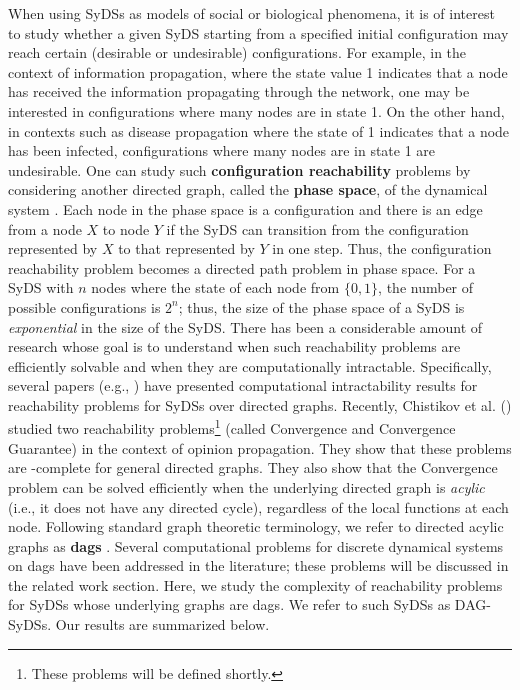 When using SyDSs as models of social or biological phenomena, it is of interest 
to study whether a given SyDS starting from a specified
initial configuration  may reach certain
(desirable or undesirable) configurations.
For example, in the context of information propagation, where the
state value 1 indicates that a node has received the information
propagating through the network,
one may be interested in configurations where many nodes are in state 1.
On the other hand, in contexts such as disease propagation where
the state of 1 indicates that a node has been infected,
configurations where many nodes are in state 1 are undesirable.
One can study such \textbf{configuration reachability} problems
by considering another directed graph,
called the \textbf{phase space}, of the dynamical system \cite{MR-2007}.
Each node in the phase space is a configuration and there is an
edge from a node $X$ to node $Y$ if the SyDS can transition from
the configuration represented by $X$ to that represented by
$Y$ in one step.
Thus, the configuration reachability problem becomes a directed
path problem in phase space.
For a SyDS with $n$ nodes where the state of each node from $\{0,1\}$,
the number of possible configurations is $2^n$; thus, the size of
the phase space of a SyDS is \emph{exponential} in the size of
the SyDS.
There has been a considerable amount of research whose goal is
to understand when such reachability problems are efficiently solvable
and when they are computationally intractable.
Specifically, several papers (e.g., \cite{OU-2017,Akutsu-etal-2007}) have
presented computational intractability results for reachability 
problems for SyDSs over directed graphs.
Recently, Chistikov et al. (\citeyear{Chistikov-etal-2020})
studied two reachability problems\footnote{These problems 
will be defined shortly.} 
(called Convergence and Convergence Guarantee)
in the context of opinion propagation.
They show that these problems are \cpsp-complete for general
directed graphs. They also show
that the Convergence problem can be solved
efficiently when the underlying directed graph is \emph{acylic} (i.e.,
it does not have any directed cycle), regardless of the local functions
at each node.
Following standard graph theoretic terminology, we refer to directed
acylic graphs as \textbf{dags} \cite{CLRS-2009}.
Several computational problems for discrete dynamical systems
on dags have been addressed in the literature; these problems
will be discussed in the related work section.
Here, we study the complexity of reachability problems for
SyDSs whose underlying graphs are dags.
We refer to such SyDSs as DAG-SyDSs.
Our results are summarized below.

